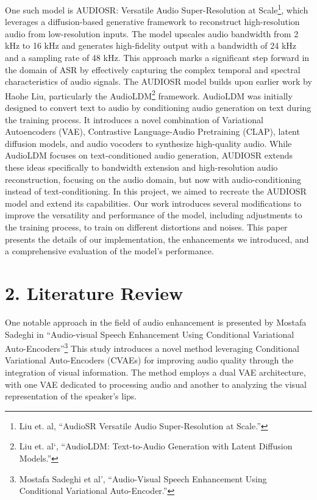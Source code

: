 \documentclass[
  ]{scrartcl}
\begin{document}
One such model is AUDIOSR: Versatile Audio Super-Resolution at
Scale\footnote{Liu et. al, {``AudioSR Versatile Audio Super-Resolution
  at Scale.''}}, which leverages a diffusion-based generative framework
to reconstruct high-resolution audio from low-resolution inputs. The
model upscales audio bandwidth from 2 kHz to 16 kHz and generates
high-fidelity output with a bandwidth of 24 kHz and a sampling rate of
48 kHz. This approach marks a significant step forward in the domain of
ASR by effectively capturing the complex temporal and spectral
characteristics of audio signals. The AUDIOSR model builds upon earlier
work by Haohe Liu, particularly the AudioLDM\footnote{Liu et. al`,
  {``AudioLDM: Text-to-Audio Generation with Latent Diffusion Models.''}}
framework. AudioLDM was initially designed to convert text to audio by
conditioning audio generation on text during the training process. It
introduces a novel combination of Variational Autoencoders (VAE),
Contrastive Language-Audio Pretraining (CLAP), latent diffusion models,
and audio vocoders to synthesize high-quality audio. While AudioLDM
focuses on text-conditioned audio generation, AUDIOSR extends these
ideas specifically to bandwidth extension and high-resolution audio
reconstruction, focusing on the audio domain, but now with
audio-conditioning instead of text-conditioning. In this project, we
aimed to recreate the AUDIOSR model and extend its capabilities. Our
work introduces several modifications to improve the versatility and
performance of the model, including adjustments to the training process,
to train on different distortions and noises. This paper presents the
details of our implementation, the enhancements we introduced, and a
comprehensive evaluation of the model's performance.

\section{2. Literature Review}\label{literature-review}

One notable approach in the field of audio enhancement is presented by
Mostafa Sadeghi in ``Audio-visual Speech Enhancement Using Conditional
Variational Auto-Encoders''\footnote{Mostafa Sadeghi et al',
  {``Audio-Visual Speech Enhancement Using Conditional Variational
  Auto-Encoder.''}} This study introduces a novel method leveraging
Conditional Variational Auto-Encoders (CVAEs) for improving audio
quality through the integration of visual information. The method
employs a dual VAE architecture, with one VAE dedicated to processing
audio and another to analyzing the visual representation of the
speaker's lips.
\end{document}
